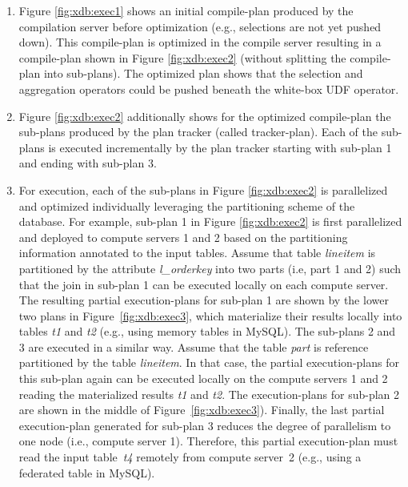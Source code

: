 \documentclass{sig-alternate}
\begin{document}
\vspace{-1.5ex}
\begin{enumerate}
\setlength{\itemsep}{-1.5pt}
\item Figure \ref{fig:xdb:exec1} shows an initial compile-plan produced by the compilation server before optimization (e.g., selections are not yet pushed down). This compile-plan is optimized in the compile server resulting in a compile-plan shown in Figure \ref{fig:xdb:exec2} (without splitting the compile-plan into sub-plans). The optimized plan shows that the selection and aggregation operators could be pushed beneath the white-box UDF operator.
\item Figure \ref{fig:xdb:exec2} additionally shows for the optimized compile-plan the sub-plans produced by the plan tracker (called tracker-plan). Each of the sub-plans is executed incrementally by the plan tracker starting with sub-plan 1 and ending with sub-plan 3.
\item For execution, each of the sub-plans in Figure \ref{fig:xdb:exec2} is parallelized and optimized individually leveraging the partitioning scheme of the database. For example, sub-plan 1 in Figure \ref{fig:xdb:exec2} is first parallelized and deployed to compute servers 1 and 2 based on the partitioning information annotated to the input tables. Assume that table \emph{lineitem} is partitioned by the attribute \emph{l\_orderkey} into two parts (i.e, part 1 and 2) such that the join in sub-plan 1 can be executed locally on each compute server. The resulting partial execution-plans for sub-plan 1 are shown by the lower two plans in Figure~\ref{fig:xdb:exec3}, which materialize their results locally into tables \emph{t1} and \emph{t2} (e.g., using memory tables in MySQL). The sub-plans 2 and 3 are executed in a similar way. Assume that the table \emph{part} is reference partitioned by the table \emph{lineitem}. In that case, the partial execution-plans for this sub-plan again can be executed locally on the compute servers 1 and 2 reading the materialized results \emph{t1} and \emph{t2}. The execution-plans for sub-plan 2 are shown in the middle of Figure~\ref{fig:xdb:exec3}). Finally, the last partial execution-plan generated for sub-plan 3 reduces the degree of parallelism to one node (i.e., compute server 1). Therefore, this partial execution-plan must read the input table~\emph{t4} remotely from compute server~2 (e.g., using a federated table in MySQL). 
\end{enumerate}
\vspace{-1.5ex}
\end{document}
